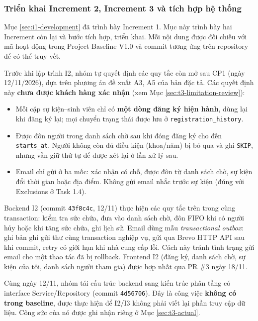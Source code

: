 \subsubsection{Triển khai Increment 2, Increment 3 và tích hợp hệ thống}
\label{sec:t3-impl}

Mục \ref{sec:i1-development} đã trình bày Increment 1. Mục này trình bày hai Increment còn lại và bước tích hợp, triển khai. Mỗi nội dung được đối chiếu với mã hoạt động trong Project Baseline V1.0 và commit tương ứng trên repository để có thể truy vết.


Trước khi lập trình I2, nhóm tự quyết định các quy tắc còn mở sau CP1 (ngày 12/11/2026), dựa trên phương án đề xuất A3, A5 của bản đặc tả. Các quyết định này \textbf{chưa được khách hàng xác nhận} (xem Mục \ref{sec:t3-limitation-review}):
\begin{itemize}
    \item Mỗi cặp sự kiện--sinh viên chỉ có \textbf{một dòng đăng ký hiện hành}, dùng lại khi đăng ký lại; mọi chuyển trạng thái được lưu ở \texttt{registration\_history}.
    \item Được đôn người trong danh sách chờ sau khi đóng đăng ký cho đến \texttt{starts\_at}. Người không còn đủ điều kiện (khoa/năm) bị bỏ qua và ghi \texttt{SKIP}, nhưng vẫn giữ thứ tự để được xét lại ở lần xử lý sau.
    \item Email chỉ gửi ở ba mốc: xác nhận có chỗ, được đôn từ danh sách chờ, sự kiện đổi thời gian hoặc địa điểm. Không gửi email nhắc trước sự kiện (đúng với Exclusions ở Task 1.4).
\end{itemize}

Backend I2 (commit \texttt{43f8c4c}, 12/11) thực hiện các quy tắc trên trong cùng transaction: kiểm tra sức chứa, đưa vào danh sách chờ, đôn FIFO khi có người hủy hoặc khi tăng sức chứa, ghi lịch sử. Email dùng mẫu \textit{transactional outbox}: ghi bản ghi gửi thư cùng transaction nghiệp vụ, gửi qua Brevo HTTP API sau khi commit, retry có giới hạn khi nhà cung cấp lỗi. Cách này tránh tình trạng gửi email cho một thao tác đã bị rollback. Frontend I2 (đăng ký, danh sách chờ, sự kiện của tôi, danh sách người tham gia) được hợp nhất qua PR \#3 ngày 18/11.

Cùng ngày 12/11, nhóm tái cấu trúc backend sang kiến trúc phân tầng có interface Service/Repository (commit \texttt{4d56706}). Đây là công việc \textbf{không có trong baseline}, được thực hiện để I2/I3 không phải viết lại phần truy cập dữ liệu. Công sức của nó được ghi nhận riêng ở Mục \ref{sec:t3-actual}.


